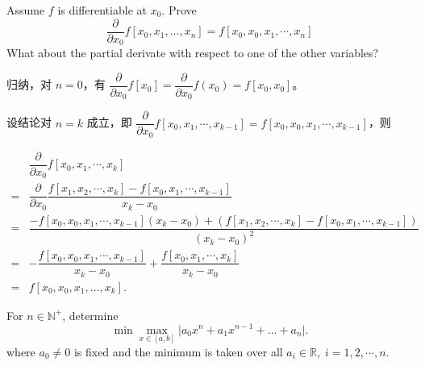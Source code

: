\documentclass[lang=cn,a4paper,newtx,bibend=bibtex]{elegantpaper}
\begin{document}
\begin{prob}
    Assume $f$ is differentiable at $x_0$. Prove
    \begin{equation}
      \frac{\partial}{\partial x_0} f[x_0,x_1,\ldots,x_n] = f[x_0,x_0,x_1,\cdots,x_n]
    \end{equation}
    What about the partial derivate with respect to one of the other variables?
\end{prob}

\begin{solution}
  归纳，对 $n=0$，有 $\dfrac{\partial}{\partial x_0}f[x_0] = \dfrac{\partial}{\partial x_0}f(x_0) = f[x_0,x_0]$。

  设结论对 $n=k$ 成立，即 $\dfrac{\partial}{\partial x_0}f[x_0,x_1,\cdots,x_{k-1}] = f[x_0,x_0,x_1,\cdots,x_{k-1}]$，则
  
  \begin{equation*}
  \begin{aligned}
    & \dfrac{\partial}{\partial x_0} f[x_0,x_1,\cdots,x_k]\\
    = & \dfrac{\partial}{\partial x_0} \dfrac{f[x_1,x_2,\cdots,x_k] - f[x_0,x_1,\cdots,x_{k-1}]}{x_k-x_0}\\
    = & \dfrac{-f[x_0,x_0,x_1,\cdots,x_{k-1}](x_k-x_0) + (f[x_1,x_2,\cdots,x_k]-f[x_0,x_1,\cdots,x_{k-1}])}{(x_k-x_0)^2}\\
    = & -\dfrac{f[x_0,x_0,x_1,\cdots,x_{k-1}]}{x_k-x_0} + \dfrac{f[x_0,x_1,\cdots,x_k]}{x_k-x_0}\\
    = & f[x_0,x_0,x_1,\dots,x_k].
  \end{aligned}
  \end{equation*}
\end{solution}

\begin{prob}
    For $n\in\mathbb{N}^+$, determine
  \begin{equation*}
    \min \max_{x\in[a,b]} \vert a_0x^n+a_1x^{n-1}+\ldots+a_n\vert.
  \end{equation*}
  where $a_0\neq 0$ is fixed and the minimum is taken over all $a_i\in\mathbb{R},\;i=1,2,\cdots,n$.
\end{prob}
\end{document}

